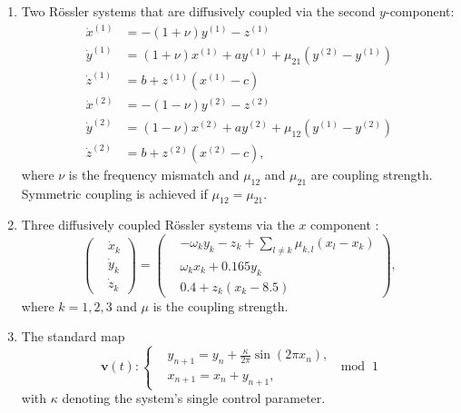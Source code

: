 \begin{enumerate}
\item Two R\"ossler systems that are diffusively coupled via the second $y$-component:
\begin{equation}
\begin{split}
\dot{x}^{(1)} &= -(1+\nu)y^{(1)} - z^{(1)} \\
\dot{y}^{(1)} &= (1+\nu)x^{(1)} + ay^{(1)} + \mu_{21}(y^{(2)}-y^{(1)}) \\
\dot{z}^{(1)} &= b+z^{(1)}(x^{(1)}-c) \\
\dot{x}^{(2)} &= -(1-\nu)y^{(2)} - z^{(2)} \\
\dot{y}^{(2)} &= (1-\nu)x^{(2)} + ay^{(2)} + \mu_{12}(y^{(1)}-y^{(2)}) \\
\dot{z}^{(2)} &= b+z^{(2)}(x^{(2)}-c), 
\end{split}
\label{eq:coupled_roessler}
\end{equation}
where $\nu$ is the frequency mismatch and $\mu_{12}$ and $\mu_{21}$ are coupling strength. Symmetric coupling is achieved if $\mu_{12} = \mu_{21}$. 

\item Three diffusively coupled R\"ossler systems via the $x$ component \cite{Nawrath2010}:
\begin{equation} \label{threeRosPRL}
\left ( \begin{aligned}
& \dot{x}_k \\ 
& \dot{y}_k \\
& \dot{z}_k
\end{aligned} \right )
= \left ( \begin{aligned}
& -\omega_k y_k - z_k + \sum_{l\neq k} \mu_{k,l}(x_l - x_k) \\ 
& \omega_k x_k + 0.165 y_k \\
& 0.4 + z_k(x_k - 8.5)
\end{aligned} \right ),
\end{equation}
where $k = 1, 2, 3$ and $\mu$ is the coupling strength.

\item The standard map
\begin{equation} \label{std_map_book}
\mathbf{v}(t): \left \{ \begin{aligned}
& y_{n+1} = y_{n} + \frac{\kappa}{2 \pi}\sin(2 \pi x_{n}),  \\
& x_{n+1} = x_{n} + y_{n+1},
\end{aligned} \;\;\text{mod}\;\; 1
\right.
\end{equation}
with $\kappa $ denoting the system's single control parameter. 

\end{enumerate}



